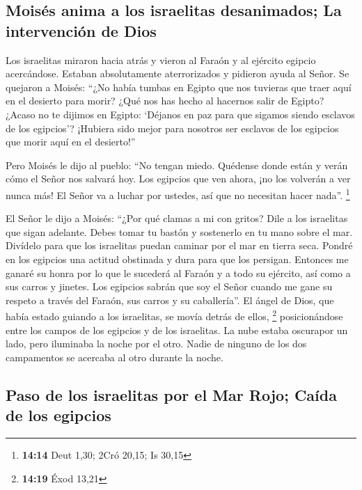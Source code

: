 \hypertarget{moisuxe9s-anima-a-los-israelitas-desanimados-la-intervenciuxf3n-de-dios}{%
\subsection{Moisés anima a los israelitas desanimados; La intervención
de
Dios}\label{moisuxe9s-anima-a-los-israelitas-desanimados-la-intervenciuxf3n-de-dios}}

 Los israelitas miraron hacia atrás y vieron al Faraón y
al ejército egipcio acercándose. Estaban absolutamente aterrorizados y
pidieron ayuda al Señor.  Se quejaron a Moisés: ``¿No
había tumbas en Egipto que nos tuvieras que traer aquí en el desierto
para morir? ¿Qué nos has hecho al hacernos salir de Egipto?
 ¿Acaso no te dijimos en Egipto: `Déjanos en paz para que
sigamos siendo esclavos de los egipcios'? ¡Hubiera sido mejor para
nosotros ser esclavos de los egipcios que morir aquí en el desierto!''

 Pero Moisés le dijo al pueblo: ``No tengan miedo.
Quédense donde están y verán cómo el Señor nos salvará hoy. Los egipcios
que ven ahora, ¡no los volverán a ver nunca más!  El
Señor va a luchar por ustedes, así que no necesitan hacer nada''.
\footnote{\textbf{14:14} Deut 1,30; 2Cró 20,15; Is 30,15}

 El Señor le dijo a Moisés: ``¿Por qué clamas a mi con
gritos? Dile a los israelitas que sigan adelante.  Debes
tomar tu bastón y sostenerlo en tu mano sobre el mar. Divídelo para que
los israelitas puedan caminar por el mar en tierra seca. 
Pondré en los egipcios una actitud obstinada y dura para que los
persigan. Entonces me ganaré su honra por lo que le sucederá al Faraón y
a todo su ejército, así como a sus carros y jinetes.  Los
egipcios sabrán que soy el Señor cuando me gane su respeto a través del
Faraón, sus carros y su caballería''.  El ángel de Dios,
que había estado guiando a los israelitas, se movía detrás de ellos,
\footnote{\textbf{14:19} Éxod 13,21}  posicionándose
entre los campos de los egipcios y de los israelitas. La nube estaba
oscurapor un lado, pero iluminaba la noche por el otro. Nadie de ninguno
de los dos campamentos se acercaba al otro durante la noche.

\hypertarget{paso-de-los-israelitas-por-el-mar-rojo-cauxedda-de-los-egipcios}{%
\subsection{Paso de los israelitas por el Mar Rojo; Caída de los
egipcios}\label{paso-de-los-israelitas-por-el-mar-rojo-cauxedda-de-los-egipcios}}

